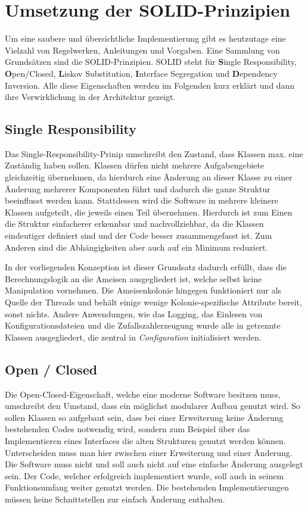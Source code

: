 \section{Umsetzung der SOLID-Prinzipien}{
	Um eine saubere und übersichtliche Implementierung gibt es heutzutage eine Vielzahl von Regelwerken, Anleitungen und Vorgaben. Eine Sammlung von Grundsätzen sind die SOLID-Prinzipien. SOLID steht für \textbf{S}ingle Responsibility, \textbf{O}pen/Closed, \textbf{L}iskov Substitution, \textbf{I}nterface Segregation und \textbf{D}ependency Inversion.
	Alle diese Eigenschaften werden im Folgenden kurz erklärt und dann ihre Verwirklichung in der Architektur gezeigt.
	
	\subsection{Single Responsibility}
	Das Single-Responsibility-Prinip umschreibt den Zustand, dass Klassen max. eine Zuständig haben sollen. Klassen dürfen nicht mehrere Aufgabengebiete gleichzeitig übernehmen, da hierdurch eine Änderung an dieser Klasse zu einer Änderung mehrerer Komponenten führt und dadurch die ganze Struktur beeinflusst werden kann.
	Stattdessen wird die Software in mehrere kleinere Klassen aufgeteilt, die jeweils einen Teil übernehmen. Hierdurch ist zum Einen die Struktur einfacherer erkennbar und nachvollziehbar, da die Klassen eindeutiger definiert sind und der Code besser zusammengefasst ist. Zum Anderen sind die Abhängigkeiten aber auch auf ein Minimum reduziert.
	
	In der vorliegenden Konzeption ist dieser Grundsatz dadurch erfüllt, dass die Berechnungslogik an die Ameisen ausgegliedert ist, welche selbst keine Manipulation vornehmen. Die Ameisenkolonie hingegen funktioniert nur als Quelle der Threads und behält einige wenige Kolonie-spezifische Attribute bereit, sonst nichts.
	Andere Anwendungen, wie das Logging, das Einlesen von Konfigurationsdateien und die Zufallszahlerzeugung wurde alle in getrennte Klassen ausgegliedert, die zentral in \textit{Configuration} initialisiert werden.
	
	\subsection{Open / Closed}
	Die Open-Closed-Eigenschaft, welche eine moderne Software besitzen muss, umschreibt den Umstand, dass ein möglichst modularer Aufbau genutzt wird. So sollen Klassen so aufgebaut sein, dass bei einer Erweiterung keine Änderung bestehenden Codes notwendig wird, sondern zum Beispiel über das Implementieren eines Interfaces die alten Strukturen genutzt werden können.
	Unterscheiden muss man hier zwischen einer Erweiterung und einer Änderung. Die Software muss nicht und soll auch nicht auf eine einfache Änderung ausgelegt sein. Der Code, welcher erfolgreich implementiert wurde, soll auch in seinem Funktionsumfang weiter genutzt werden. Die bestehenden Implementierungen müssen keine Schnittstellen zur einfach Änderung enthalten.
	
}
